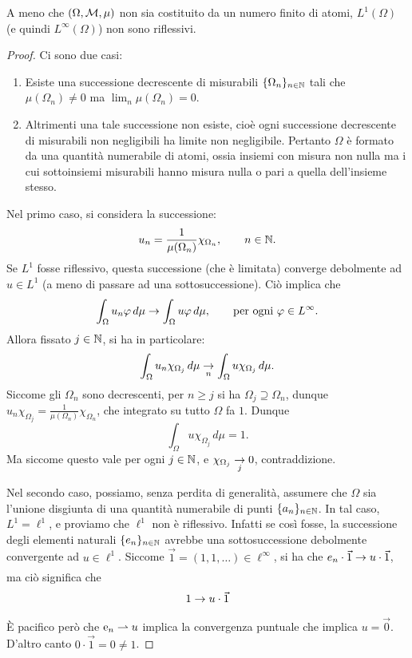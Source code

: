 \begin{theorem}
	A meno che $(\Omega, \M, \mu)$ non sia costituito da un numero finito di atomi, $L^1(\Omega)$ (e quindi $L^\infty(\Omega)$) non sono riflessivi.
\end{theorem}
\begin{proof}
	Ci sono due casi:
	\begin{enumerate}
		\item Esiste una successione decrescente di misurabili $\{\Omega_n\}_{n \in \N}$ tali che $\mu(\Omega_n) \neq 0$ ma $\lim_n \mu(\Omega_n) = 0$.

		\item Altrimenti una tale successione non esiste, cioè ogni successione decrescente di misurabili non negligibili ha limite non negligibile. Pertanto $\Omega$ è formato da una quantità numerabile di atomi, ossia insiemi con misura non nulla ma i cui sottoinsiemi misurabili hanno misura nulla o pari a quella dell'insieme stesso.
	\end{enumerate}

	Nel primo caso, si considera la successione:
	\begin{equation*}
		u_n = \frac1{\mu(\Omega_n)} \chi_{\Omega_n}, \qquad n \in \N.
	\end{equation*}
	Se $L^1$ fosse riflessivo, questa successione (che è limitata) converge debolmente ad $u \in L^1$ (a meno di passare ad una sottosuccessione). Ciò implica che
	\begin{equation*}
		\int_\Omega u_n \varphi \,d\mu \conv \int_\Omega u \varphi\,d\mu, \qquad \text{per ogni $\varphi \in L^\infty$}.
	\end{equation*}
	Allora fissato $j \in \N$, si ha in particolare:
	\begin{equation*}
		\int_\Omega u_n \chi_{\Omega_j} \,d\mu \conv[n] \int_\Omega u \chi_{\Omega_j}\,d\mu.
	\end{equation*}
	Siccome gli $\Omega_n$ sono decrescenti, per $n \geq j$ si ha $\Omega_j \supseteq \Omega_n$, dunque $u_n \chi_{\Omega_j} = \frac1{\mu(\Omega_n)} \chi_{\Omega_n}$, che integrato su tutto $\Omega$ fa $1$. Dunque
	\begin{equation*}
		\int_\Omega u \chi_{\Omega_j} \,d\mu = 1.
	\end{equation*}
	Ma siccome questo vale per ogni $j \in \N$, e $\chi_{\Omega_j} \conv[j] 0$, contraddizione.

	Nel secondo caso, possiamo, senza perdita di generalità, assumere che $\Omega$ sia l'unione disgiunta di una quantità numerabile di punti $\{a_n\}_{n \in \N}$. In tal caso, $L^1 = \ell^1$, e proviamo che $\ell^1$ non è riflessivo. Infatti se così fosse, la successione degli elementi naturali $\{e_n\}_{n \in \N}$ avrebbe una sottosuccessione debolmente convergente ad $u \in \ell^1$. Siccome $\vec 1 =(1,1, \ldots) \in \ell^\infty$, si ha che $e_n \cdot \vec 1 \conv u \cdot \vec 1$, ma ciò significa che
	\begin{equation*}
		1 \conv u \cdot \vec 1
	\end{equation*}
	È pacifico però che $\e_n \weakconv u$ implica la convergenza puntuale che implica $u= \vec 0$. D'altro canto $0 \cdot \vec 1 = 0 \neq 1$.


\end{proof}
